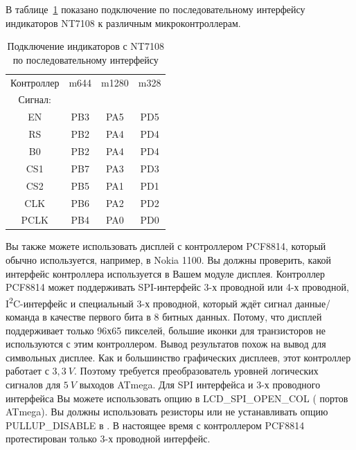 В таблице~\ref{tab:7108-processor} показано подключение по последовательному интерфейсу индикаторов 
NT7108 к различным микроконтроллерам.
\begin{table}[H]
  \begin{center}
    \begin{tabular}{| c || c | c | c |}
    \hline
Контроллер  & m644  &  m1280  & m328 \\
Сигнал:     &       &        &         \\
    \hline
    \hline
  EN        &  PB3  &  PA5   & PD5     \\
    \hline
  RS        &  PB2  &  PA4   & PD4      \\
  B0        &  PB2  &  PA4   & PD4      \\
    \hline
  CS1       &  PB7  &  PA3   & PD3      \\
    \hline
  CS2       &  PB5  &  PA1   & PD1      \\
    \hline
  CLK       &  PB6  &  PA2   & PD2      \\
    \hline
  PCLK      &  PB4  &  PA0   & PD0      \\
    \hline
    \end{tabular}
  \end{center}
  \caption{Подключение индикаторов с NT7108 по последовательному интерфейсу}
  \label{tab:7108-processor}
\end{table}

Вы также можете использовать дисплей с контроллером PCF8814, который обычно используется, 
например, в Nokia 1100. 
Вы должны проверить, какой интерфейс контроллера используется в Вашем модуле дисплея.
Контроллер PCF8814 может поддерживать SPI-интерфейс 3-х проводной или 4-х проводной, 
I\textsuperscript{2}C-интерфейс и специальный 3-х проводной, который ждёт сигнал 
данные/команда в качестве первого бита в 8 битных данных.
Потому, что дисплей поддерживает только 96х65 пикселей, большие иконки для транзисторов не используются 
с этим контроллером. Вывод результатов похож на вывод для символьных дисплее. 
Как и большинство графических дисплеев, этот контроллер работает с \(3,3~V\). 
Поэтому требуется преобразователь уровней логических сигналов для \(5~V\) выходов ATmega.
Для SPI интерфейса и 3-х проводного интерфейса Вы можете использовать опцию в 
LCD\_SPI\_OPEN\_COL ( портов ATmega).
Вы должны использовать  резисторы или не устанавливать 
опцию PULLUP\_DISABLE в .  
В настоящее время с контроллером PCF8814 протестирован только 3-х проводной интерфейс.

